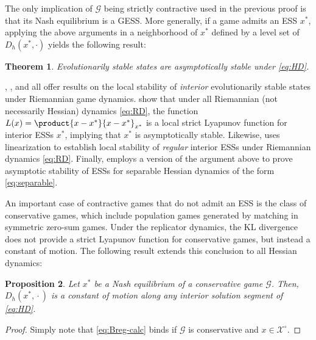 \documentclass[reqno]{amsart}
\theoremstyle{plain}
\newtheorem{theorem}{Theorem}
\newtheorem{proposition}[theorem]{Proposition}
\theoremstyle{definition}
\theoremstyle{remark}
\numberwithin{equation}{section}
\numberwithin{theorem}{section}
\begin{document}
The only implication of ${\mathcal{G}}$ being strictly contractive used in the previous proof is that its Nash equilibrium is a \ac{GESS}.
More generally, if a game admits an \ac{ESS} ${x^{\ast}}$, applying the above arguments in a neighborhood of ${x^{\ast}}$ defined by a level set of ${D_{h}}({x^{\ast}},\cdot)$ yields the following result:

\begin{theorem}
\label{thm:ESS}
Evolutionarily stable states are asymptotically stable under \eqref{eq:HD}.
\end{theorem}

\cite{HS90}, \cite{Hop99b}, and \cite{Har11} all offer results on the local stability of \emph{interior} evolutionarily stable states under Riemannian game dynamics.
\cite{HS90} show that under all Riemannian (not necessarily Hessian) dynamics \eqref{eq:RD}, the function ${L}(x) = \product{x-{x^{\ast}}}{x-{x^{\ast}}}_{x^{\ast}}$ is a local strict Lyapunov function for interior \acp{ESS} ${x^{\ast}}$, implying that ${x^{\ast}}$ is asymptotically stable.
Likewise, \cite{Hop99b} uses linearization to establish local stability of \emph{regular} interior \acp{ESS} \citep{TJ78} under Riemannian dynamics \eqref{eq:RD}.
Finally, \cite{Har11} employs a version of the argument above to prove asymptotic stability of \acp{ESS} for separable Hessian dynamics of the form \eqref{eq:separable}.

An important case of contractive games that do not admit an \ac{ESS} is the class of conservative games, which include population games generated by matching in symmetric zero-sum games.
Under the replicator dynamics, the \ac{KL} divergence does not provide a strict Lyapunov function for conservative games, but instead a constant of motion.
The following result extends this conclusion to all Hessian dynamics:

\begin{proposition}
\label{prop:conservative}
Let ${x^{\ast}}$ be a Nash equilibrium of a conservative game ${\mathcal{G}}$.
Then, ${D_{h}}({x^{\ast}},{\mathopen{}\cdot\mathopen{}})$ is a constant of motion along any interior solution segment of \eqref{eq:HD}.
\end{proposition}

\begin{proof}
Simply note that \eqref{eq:Breg-calc} binds if ${\mathcal{G}}$ is conservative and $x\in{{\mathcal{X}}^{\circ}}$.
\end{proof}
\end{document}
